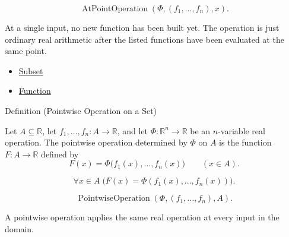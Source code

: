 \begin{remark*}
\[
  \operatorname{AtPointOperation}(\Phi,(f_1,\ldots,f_n),x).
\]
\end{remark*}

\begin{remark*}[Interpretation]
At a single input, no new function has been built yet.  The operation is just
ordinary real arithmetic after the listed functions have been evaluated at the
same point.
\end{remark*}

\begin{dependencies}
\begin{itemize}
  \item \hyperref[def:subset]{Subset}
  \item \hyperref[def:function]{Function}
\end{itemize}
\end{dependencies}

\begin{definitionbox}{Definition (Pointwise Operation on a Set)}
\begin{definition}
\label{def:pointwise-operation-on-set}
Let \(A\subseteq\mathbb{R}\), let \(f_1,\ldots,f_n:A\to\mathbb{R}\),
and let \(\Phi:\mathbb{R}^n\to\mathbb{R}\) be an \(n\)-variable real
operation.  The pointwise operation determined by \(\Phi\) on \(A\) is the
function \(F:A\to\mathbb{R}\) defined by
\[
  F(x)=\Phi\bigl(f_1(x),\ldots,f_n(x)\bigr)
  \qquad (x\in A).
\]
\end{definition}
\end{definitionbox}

\begin{remark*}
\[
  \forall x\in A\;
  \bigl(F(x)=\Phi(f_1(x),\ldots,f_n(x))\bigr).
\]
\end{remark*}

\begin{remark*}
\[
  \operatorname{PointwiseOperation}(\Phi,(f_1,\ldots,f_n),A).
\]
\end{remark*}

\begin{remark*}[Interpretation]
A pointwise operation applies the same real operation at every input in the
domain.
\end{remark*}

